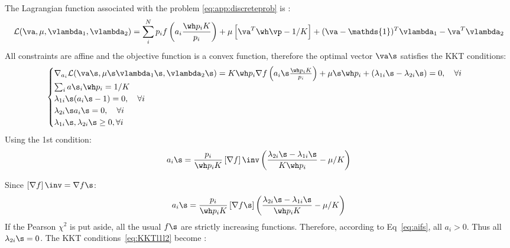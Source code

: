 \documentclass[twoside]{article}
\begin{document}
The Lagrangian function associated with the problem  \ref{eq:app:discreteprob} is :
\begin{align}
    \mathcal{L}(\va, \mu ,\vlambda_1, \vlambda_2) = \sum_i^N p_if\left(a_i \frac{\wh p_iK}{p_i }\right) + \mu \left[ \va^T \wh \vp- 1/K\right] + (\va-\mathds{1})^T\vlambda_1 - \va^T\vlambda_2
\end{align}
All constraints are affine and the objective function is a convex function, therefore the optimal vector $\va\s$ satisfies the KKT conditions: 
\begin{equation}
\label{eq:KKTl1l2}
 \begin{cases}
\nabla_{a_i} \mathcal{L}(\va\s, \mu\s \vlambda_1\s, \vlambda_2\s) = K\wh p_i\nabla f\left(a_i\s \frac{\wh p_iK}{p_i }\right) + \mu\s\wh p_i + (\lambda_{1i}\s-\lambda_{2i}\s) = 0,  \quad \forall i \\
\sum_i a\s_i \wh p_i=  1/K \\
\lambda_{1i}\s(a_i\s-1)=0, \quad \forall i \\
\lambda_{2i}\s a_i\s=0, \quad \forall i \\
\lambda_{1i}\s, \lambda_{2i}\s\geq 0, \forall i
\end{cases}
\end{equation}
Using the 1st condition: 
\begin{align}
    a_i\s= \frac{p_i }{\wh p_i K } \left[\nabla f\right]\inv\left(\frac{\lambda_{2i}\s-\lambda_{1i}\s}{K\wh p_i} - \mu/K\right)
\end{align}

Since $\left[ \nabla f\right]\inv = \nabla f\s$:
\begin{align}
\label{eq:aifs}
    a_i\s= \frac{p_i }{\wh p_iK } \left[\nabla f\s
    \right]\left(\frac{\lambda_{2i}\s-\lambda_{1i}\s}{\wh p_iK} - \mu/K\right)
\end{align}
If the Pearson $\chi^2$ is put aside, all the usual $f\s$ are strictly increasing functions. Therefore, according to Eq~\ref{eq:aifs}, all $a_i>0$. Thus all $\lambda_{2i}\s=0$.
The KKT conditions~\ref{eq:KKTl1l2} become :
\end{document}
